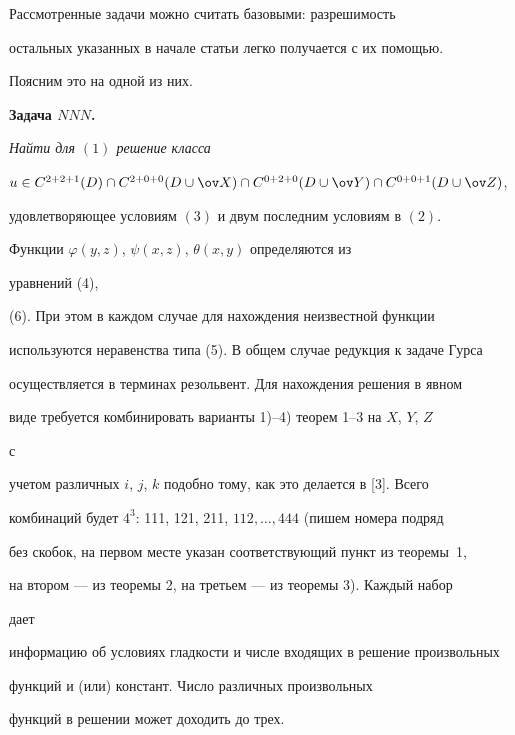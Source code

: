 


Рассмотренные задачи можно считать базовыми: разрешимость 


остальных указанных в начале статьи легко получается с их помощью. 


Поясним это на одной из них. 


\medskip 


 


{\bf Задача $NNN$.} {\it Найти для $(1)$ решение класса 


$u\in C^{2+2+1}(D) \cap C^{2+0+0}(D\cup\ov X) \cap C^{0+2+0}(D\cup\ov Y) 


\cap C^{0+0+1}(D\cup\ov Z)$, 


удовлетворяющее условиям $(3)$ и двум последним условиям в $(2)$.} 


\medskip 


 


Функции $\varphi(y,z)$, $\psi(x,z)$, $\theta(x,y)$ определяются из 


уравнений (4), 


(6). При этом в каждом случае для нахождения неизвестной функции 


используются неравенства типа (5). В общем случае редукция к задаче Гурса 


осуществляется в терминах резольвент. Для нахождения решения в явном 


виде требуется комбинировать варианты 1)--4) теорем 1--3 на $X$, $Y$, $Z$ 


с 


учетом различных $i$, $j$, $k$ подобно тому, как это делается в [3]. Всего 


комбинаций будет $4^3$: 111, 121, 211, $112,\dotsc,444$ (пишем номера подряд 


без скобок, на первом месте указан соответствующий пункт из теоремы~1, 


на втором --- из теоремы 2, на третьем --- из теоремы 3). Каждый набор 


дает 


информацию об условиях гладкости и числе входящих в решение произвольных 


функций и (или) констант. Число различных произвольных 


функций в решении может доходить до трех. 


 


